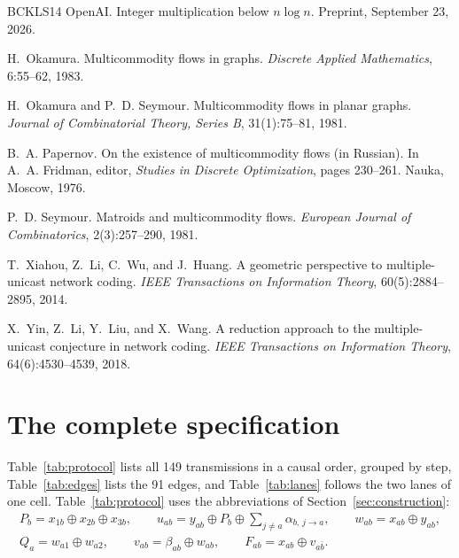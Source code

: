 \documentclass[11pt]{article}
\newcommand{\al}[3]{\alpha_{#1,\,#2\to#3}}
\begin{document}
\begin{thebibliography}{BCKLS14}
OpenAI.
\newblock Integer multiplication below {$n\log n$}.
\newblock Preprint, September 23, 2026.

H.~Okamura.
\newblock Multicommodity flows in graphs.
\newblock \emph{Discrete Applied Mathematics}, 6:55--62, 1983.

H.~Okamura and P.~D. Seymour.
\newblock Multicommodity flows in planar graphs.
\newblock \emph{Journal of Combinatorial Theory, Series B}, 31(1):75--81, 1981.

B.~A. Papernov.
\newblock On the existence of multicommodity flows (in Russian).
\newblock In A.~A. Fridman, editor, \emph{Studies in Discrete Optimization}, pages 230--261. Nauka, Moscow, 1976.

P.~D. Seymour.
\newblock Matroids and multicommodity flows.
\newblock \emph{European Journal of Combinatorics}, 2(3):257--290, 1981.

T.~Xiahou, Z.~Li, C.~Wu, and J.~Huang.
\newblock A geometric perspective to multiple-unicast network coding.
\newblock \emph{IEEE Transactions on Information Theory}, 60(5):2884--2895, 2014.

X.~Yin, Z.~Li, Y.~Liu, and X.~Wang.
\newblock A reduction approach to the multiple-unicast conjecture in network coding.
\newblock \emph{IEEE Transactions on Information Theory}, 64(6):4530--4539, 2018.

\end{thebibliography}

\clearpage
\appendix

\section{The complete specification}\label{app:spec}

Table~\ref{tab:protocol} lists all 149 transmissions in a causal order, grouped by step, Table~\ref{tab:edges} lists the 91 edges, and Table~\ref{tab:lanes} follows the two lanes of one cell. Table~\ref{tab:protocol} uses the abbreviations of Section~\ref{sec:construction}:
\[
\begin{gathered}
P_b=x_{1b}\oplus x_{2b}\oplus x_{3b},\qquad
u_{ab}=y_{ab}\oplus P_b\oplus\textstyle\sum_{j\neq a}\al{b}{j}{a},\qquad
w_{ab}=x_{ab}\oplus y_{ab},\\
Q_a=w_{a1}\oplus w_{a2},\qquad
v_{ab}=\beta_{ab}\oplus w_{ab},\qquad
F_{ab}=x_{ab}\oplus v_{a\bar b}.
\end{gathered}
\]
\end{document}
